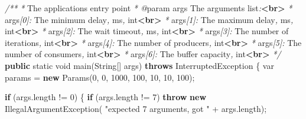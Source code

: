 \documentclass[11pt]{article}
\newenvironment{Shaded}{}{}
\newcommand{\KeywordTok}[1]{\textcolor[rgb]{0.00,0.44,0.13}{\textbf{{#1}}}}
\newcommand{\DataTypeTok}[1]{\textcolor[rgb]{0.56,0.13,0.00}{{#1}}}
\newcommand{\DecValTok}[1]{\textcolor[rgb]{0.25,0.63,0.44}{{#1}}}
\newcommand{\StringTok}[1]{\textcolor[rgb]{0.25,0.44,0.63}{{#1}}}
\newcommand{\CommentTok}[1]{\textcolor[rgb]{0.38,0.63,0.69}{\textit{{#1}}}}
\newcommand{\FunctionTok}[1]{\textcolor[rgb]{0.02,0.16,0.49}{{#1}}}
\newcommand{\NormalTok}[1]{{#1}}
\newcommand{\ControlFlowTok}[1]{\textcolor[rgb]{0.00,0.44,0.13}{\textbf{{#1}}}}
\newcommand{\OperatorTok}[1]{\textcolor[rgb]{0.40,0.40,0.40}{{#1}}}
\newcommand{\BuiltInTok}[1]{{#1}}
\begin{document}
\begin{Shaded}
\begin{Highlighting}[]
    \CommentTok{/**}
     \CommentTok{*}\NormalTok{ The application}\CommentTok{\textquotesingle{}}\NormalTok{s entry point}
\CommentTok{     * @}\NormalTok{param args The arguments list}\CommentTok{:}\KeywordTok{\textless{}br\textgreater{}}
     \CommentTok{*}\NormalTok{             args}\CommentTok{[0]:}\NormalTok{ The minimum delay}\CommentTok{,}\NormalTok{ ms}\CommentTok{,} \CommentTok{\textasciigrave{}}\NormalTok{int}\CommentTok{\textasciigrave{}}\KeywordTok{\textless{}br\textgreater{}}
     \CommentTok{*}\NormalTok{             args}\CommentTok{[1]:}\NormalTok{ The maximum delay}\CommentTok{,}\NormalTok{ ms}\CommentTok{,} \CommentTok{\textasciigrave{}}\NormalTok{int}\CommentTok{\textasciigrave{}}\KeywordTok{\textless{}br\textgreater{}}
     \CommentTok{*}\NormalTok{             args}\CommentTok{[2]:}\NormalTok{ The wait timeout}\CommentTok{,}\NormalTok{ ms}\CommentTok{,} \CommentTok{\textasciigrave{}}\NormalTok{int}\CommentTok{\textasciigrave{}}\KeywordTok{\textless{}br\textgreater{}}
     \CommentTok{*}\NormalTok{             args}\CommentTok{[3]:}\NormalTok{ The number of iterations}\CommentTok{,} \CommentTok{\textasciigrave{}}\NormalTok{int}\CommentTok{\textasciigrave{}}\KeywordTok{\textless{}br\textgreater{}}
     \CommentTok{*}\NormalTok{             args}\CommentTok{[4]:}\NormalTok{ The number of producers}\CommentTok{,} \CommentTok{\textasciigrave{}}\NormalTok{int}\CommentTok{\textasciigrave{}}\KeywordTok{\textless{}br\textgreater{}}
     \CommentTok{*}\NormalTok{             args}\CommentTok{[5]:}\NormalTok{ The number of consumers}\CommentTok{,} \CommentTok{\textasciigrave{}}\NormalTok{int}\CommentTok{\textasciigrave{}}\KeywordTok{\textless{}br\textgreater{}}
     \CommentTok{*}\NormalTok{             args}\CommentTok{[6]:}\NormalTok{ The buffer capacity}\CommentTok{,} \CommentTok{\textasciigrave{}}\NormalTok{int}\CommentTok{\textasciigrave{}}\KeywordTok{\textless{}br\textgreater{}}
     \CommentTok{*/}
    \KeywordTok{public} \DataTypeTok{static} \DataTypeTok{void} \FunctionTok{main}\OperatorTok{(}\BuiltInTok{String}\OperatorTok{[]}\NormalTok{ args}\OperatorTok{)} \KeywordTok{throws} \BuiltInTok{InterruptedException} \OperatorTok{\{}
        \DataTypeTok{var}\NormalTok{ params }\OperatorTok{=} \KeywordTok{new} \FunctionTok{Params}\OperatorTok{(}\DecValTok{0}\OperatorTok{,} \DecValTok{0}\OperatorTok{,} \DecValTok{1000}\OperatorTok{,} \DecValTok{100}\OperatorTok{,} \DecValTok{10}\OperatorTok{,} \DecValTok{10}\OperatorTok{,} \DecValTok{100}\OperatorTok{);}

        \ControlFlowTok{if} \OperatorTok{(}\NormalTok{args}\OperatorTok{.}\FunctionTok{length} \OperatorTok{!=} \DecValTok{0}\OperatorTok{)} \OperatorTok{\{}
            \ControlFlowTok{if} \OperatorTok{(}\NormalTok{args}\OperatorTok{.}\FunctionTok{length} \OperatorTok{!=} \DecValTok{7}\OperatorTok{)}
                \ControlFlowTok{throw} \KeywordTok{new} \BuiltInTok{IllegalArgumentException}\OperatorTok{(}
                    \StringTok{"expected 7 arguments, got "} \OperatorTok{+}\NormalTok{ args}\OperatorTok{.}\FunctionTok{length}\OperatorTok{);}


\end{Highlighting}
\end{Shaded}
\end{document}
